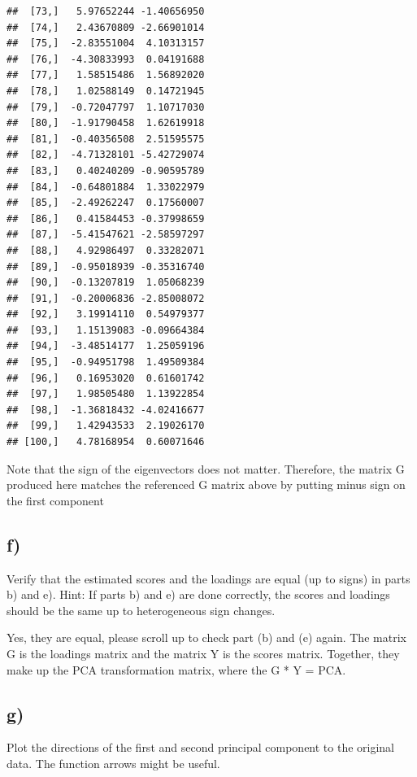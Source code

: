 \documentclass[
]{article}
\begin{document}
\begin{verbatim}
##  [73,]   5.97652244 -1.40656950
##  [74,]   2.43670809 -2.66901014
##  [75,]  -2.83551004  4.10313157
##  [76,]  -4.30833993  0.04191688
##  [77,]   1.58515486  1.56892020
##  [78,]   1.02588149  0.14721945
##  [79,]  -0.72047797  1.10717030
##  [80,]  -1.91790458  1.62619918
##  [81,]  -0.40356508  2.51595575
##  [82,]  -4.71328101 -5.42729074
##  [83,]   0.40240209 -0.90595789
##  [84,]  -0.64801884  1.33022979
##  [85,]  -2.49262247  0.17560007
##  [86,]   0.41584453 -0.37998659
##  [87,]  -5.41547621 -2.58597297
##  [88,]   4.92986497  0.33282071
##  [89,]  -0.95018939 -0.35316740
##  [90,]  -0.13207819  1.05068239
##  [91,]  -0.20006836 -2.85008072
##  [92,]   3.19914110  0.54979377
##  [93,]   1.15139083 -0.09664384
##  [94,]  -3.48514177  1.25059196
##  [95,]  -0.94951798  1.49509384
##  [96,]   0.16953020  0.61601742
##  [97,]   1.98505480  1.13922854
##  [98,]  -1.36818432 -4.02416677
##  [99,]   1.42943533  2.19026170
## [100,]   4.78168954  0.60071646
\end{verbatim}

Note that the sign of the eigenvectors does not matter. Therefore, the
matrix G produced here matches the referenced G matrix above by putting
minus sign on the first component

\hypertarget{f}{%
\subsection{f)}\label{f}}

Verify that the estimated scores and the loadings are equal (up to
signs) in parts b) and e). Hint: If parts b) and e) are done correctly,
the scores and loadings should be the same up to heterogeneous sign
changes.

Yes, they are equal, please scroll up to check part (b) and (e) again.
The matrix G is the loadings matrix and the matrix Y is the scores
matrix. Together, they make up the PCA transformation matrix, where the
G * Y = PCA.

\hypertarget{g}{%
\subsection{g)}\label{g}}

Plot the directions of the first and second principal component to the
original data. The function arrows might be useful.
\end{document}
